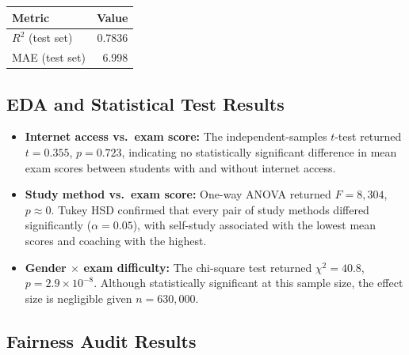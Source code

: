 \documentclass[12pt, letterpaper]{article}
\begin{document}
\begin{center}
\begin{tabular}{@{}lr@{}}
\toprule
\textbf{Metric} & \textbf{Value} \\
\midrule
$R^2$ (test set) & 0.7836 \\
MAE (test set)   & 6.998 \\
\bottomrule
\end{tabular}
\end{center}

\subsection{EDA and Statistical Test Results}

\begin{itemize}[noitemsep]
    \item \textbf{Internet access vs.\ exam score:} The independent-samples $t$-test
          returned $t = 0.355$, $p = 0.723$, indicating no statistically significant
          difference in mean exam scores between students with and without internet access.
    \item \textbf{Study method vs.\ exam score:} One-way ANOVA returned $F = 8{,}304$,
          $p \approx 0$. Tukey HSD confirmed that every pair of study methods differed
          significantly ($\alpha = 0.05$), with self-study associated with the lowest
          mean scores and coaching with the highest.
    \item \textbf{Gender $\times$ exam difficulty:} The chi-square test returned
          $\chi^2 = 40.8$, $p = 2.9 \times 10^{-8}$. Although statistically significant
          at this sample size, the effect size is negligible given $n = 630{,}000$.
\end{itemize}

\subsection{Fairness Audit Results}
\end{document}
